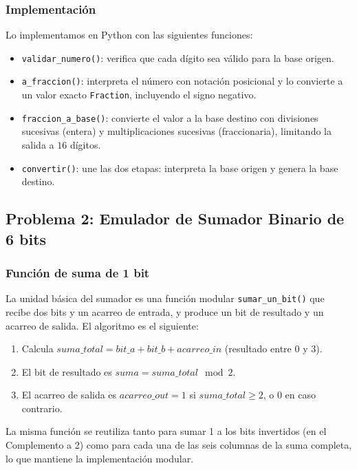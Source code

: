 \documentclass[a4paper,12pt]{article}
\begin{document}
\subsubsection{Implementaci\'{o}n}

Lo implementamos en Python con las siguientes funciones:
\begin{itemize}
    \item \texttt{validar\_numero()}: verifica que cada d\'{i}gito sea v\'{a}lido para la base origen.
    \item \texttt{a\_fraccion()}: interpreta el n\'{u}mero con notaci\'{o}n posicional y lo convierte a un valor exacto \texttt{Fraction}, incluyendo el signo negativo.
    \item \texttt{fraccion\_a\_base()}: convierte el valor a la base destino con divisiones sucesivas (entera) y multiplicaciones sucesivas (fraccionaria), limitando la salida a $16$ d\'{i}gitos.
    \item \texttt{convertir()}: une las dos etapas: interpreta la base origen y genera la base destino.
\end{itemize}

\subsection{Problema 2: Emulador de Sumador Binario de 6 bits}

\subsubsection{Funci\'{o}n de suma de 1 bit}

La unidad b\'{a}sica del sumador es una funci\'{o}n modular \texttt{sumar\_un\_bit()} que recibe dos bits y un acarreo de entrada, y produce un bit de resultado y un acarreo de salida. El algoritmo es el siguiente:

\begin{enumerate}
    \item Calcula $suma\_total = bit\_a + bit\_b + acarreo\_in$ (resultado entre $0$ y $3$).
    \item El bit de resultado es $suma = suma\_total \mod 2$.
    \item El acarreo de salida es $acarreo\_out = 1$ si $suma\_total \geq 2$, o $0$ en caso contrario.
\end{enumerate}

La misma funci\'{o}n se reutiliza tanto para sumar 1 a los bits invertidos (en el Complemento a 2) como para cada una de las seis columnas de la suma completa, lo que mantiene la implementaci\'{o}n modular.
\end{document}
